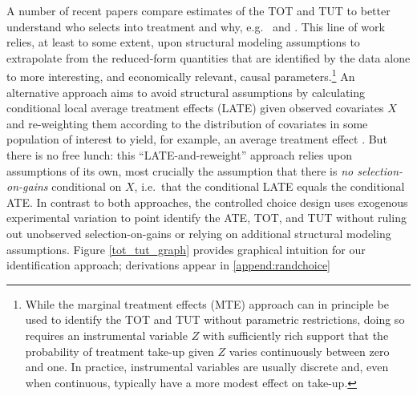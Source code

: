 \documentclass[oneside,11pt]{article}
\begin{document}
A number of recent papers compare estimates of the TOT and TUT to better understand who selects into treatment and why, e.g.\ \cite{cornelissen2018benefits} and \cite{Walters}. 
This line of work relies, at least to some extent, upon structural modeling assumptions to extrapolate from the reduced-form quantities that are identified by the data alone to more interesting, and economically relevant, causal parameters.\footnote{While the marginal treatment effects (MTE) approach \citep{heckman2007econometric} can in principle be used to identify the TOT and TUT without parametric restrictions, doing so requires an instrumental variable $Z$ with sufficiently rich support that the probability of treatment take-up given $Z$ varies continuously between zero and one. In practice, instrumental variables are usually discrete and, even when continuous, typically have a more modest effect on take-up.} 
An alternative approach aims to avoid structural assumptions by calculating conditional local average treatment effects (LATE) given observed covariates $X$ and re-weighting them according to the distribution of covariates in some population of interest to yield, for example, an average treatment effect \citep{aronow2013beyond,angrist2013extrapolate}. 
But there is no free lunch: this ``LATE-and-reweight'' approach relies upon assumptions of its own, most crucially the assumption that there is \emph{no selection-on-gains} conditional on $X$, i.e.\ that the conditional LATE equals the conditional ATE. 
In contrast to both approaches, the controlled choice design uses exogenous experimental variation to point identify the ATE, TOT, and TUT without ruling out unobserved selection-on-gains or relying on additional structural modeling assumptions.
Figure \ref{tot_tut_graph} provides graphical intuition for our identification approach; derivations appear in \ref{append:randchoice}
\end{document}
